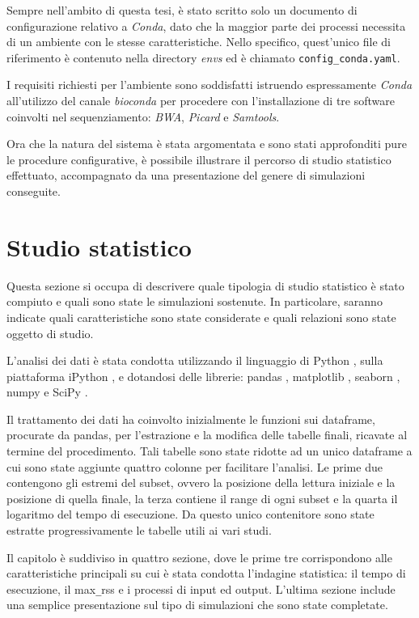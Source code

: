 Sempre nell'ambito di questa tesi, è stato scritto solo un documento di configurazione relativo a \textit{Conda}, dato che la maggior parte dei processi necessita di un ambiente con le stesse caratteristiche.
Nello specifico, quest'unico file di riferimento è contenuto nella directory \textit{envs} ed è chiamato \verb!config_conda.yaml!.

I requisiti richiesti per l'ambiente sono soddisfatti istruendo espressamente \textit{Conda} all'utilizzo del canale \textit{bioconda} per procedere con l'installazione di tre software coinvolti nel sequenziamento: \textit{BWA}, \textit{Picard} e \textit{Samtools}.

Ora che la natura del sistema è stata argomentata e sono stati approfonditi pure le procedure configurative, è possibile illustrare il percorso di studio statistico effettuato, accompagnato da una presentazione del genere di simulazioni conseguite.

\section{Studio statistico}
Questa sezione si occupa di descrivere quale tipologia di studio statistico è stato compiuto e quali sono state le simulazioni sostenute. 
In particolare, saranno indicate quali caratteristiche sono state considerate e quali relazioni sono state oggetto di studio.     

L'analisi dei dati è stata condotta utilizzando il linguaggio di Python \cite{Python}, sulla piattaforma iPython \cite{IPython}, e dotandosi delle librerie: pandas \cite{pandas}, matplotlib \cite{Matplotlib}, seaborn \cite{seaborn}, numpy \cite{Numpy} e SciPy \cite{Scipy}.

Il trattamento dei dati ha coinvolto inizialmente le funzioni sui dataframe, procurate da pandas, per l'estrazione e la modifica delle tabelle finali, ricavate al termine del procedimento.
Tali tabelle sono state ridotte ad un unico dataframe a cui sono state aggiunte quattro colonne per facilitare l'analisi. 
Le prime due contengono gli estremi del subset, ovvero la posizione della lettura iniziale e la posizione di quella finale, la terza contiene il range di ogni subset e la quarta il logaritmo del tempo di esecuzione.
Da questo unico contenitore sono state estratte progressivamente le tabelle utili ai vari studi.

Il capitolo è suddiviso in quattro sezione, dove le prime tre corrispondono alle caratteristiche principali su cui è stata condotta l'indagine statistica: il tempo di esecuzione, il max\verb!_!rss e i processi di input ed output. 
L'ultima sezione include una semplice presentazione sul tipo di simulazioni che sono state completate.


